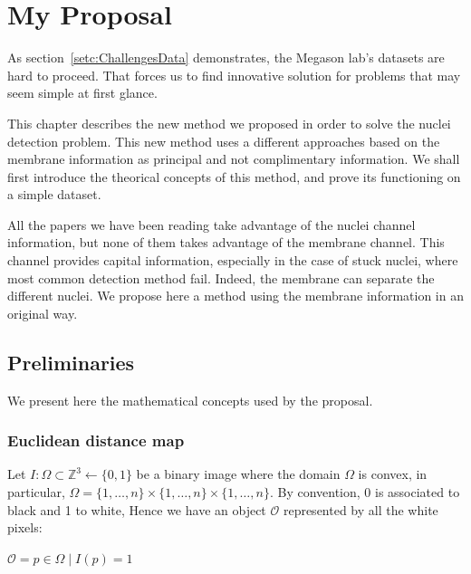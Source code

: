 
\chapter{My Proposal}
\label{chapt:proposal}


As section~\ref{setc:ChallengesData} demonstrates, the Megason lab's datasets are hard to proceed. That forces us to find innovative solution for problems that may seem simple at first glance.

This chapter describes the new method we proposed in order to solve the nuclei detection problem. This new method uses a different approaches based on the membrane information as principal and not complimentary information. We shall first introduce the theorical concepts of this method, and prove its functioning on a simple dataset.


All the papers we have been reading take advantage of the nuclei channel information, but none of them takes advantage of the membrane channel.
This channel provides capital information, especially in the case of stuck nuclei, where most common detection method fail.
Indeed, the membrane can separate the different nuclei.
We propose here a method using the membrane information in an original way.





\section{Preliminaries}
\label{sect:definitions}
We present here the mathematical concepts used by the proposal.


\subsection{Euclidean distance map}
\label{subsec:EuclDistMapDef}
Let \( I : \Omega \subset \mathbb{Z}^3 \leftarrow \{0,1\} \) be a binary image where the domain \({\Omega}\) is convex, in particular, \( \Omega  = \{1,{\dots},n\}{\times}\{1,{\dots},n\}{\times}\{1,{\dots},n\} \). By convention, 0 is associated to black and 1 to white, Hence we have an object \({\mathcal{O}}\) represented by all the white pixels:\\
\begin{center}
\( {\mathcal{O}} = p \in \Omega \mid I(p)=1 \)
\end{center}

